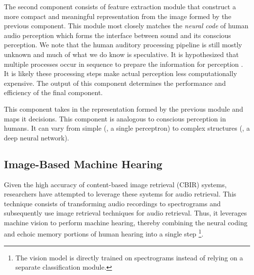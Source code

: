 The second component consists of feature extraction module that construct a more
compact and meaningful representation from the image formed by the previous
component.
This module most closely matches the \textit{neural code} of human audio
perception which forms the interface between sound and its conscious perception.
We note that the human auditory processing pipeline is still mostly unknown
and much of what we do know is speculative. 
It is hypothesized that multiple processes occur in
sequence to prepare the information for perception \cite{Eggermont2001}. 
It is likely these processing steps make actual perception less computationally
expensive. The output of this component determines the performance and
efficiency of the final component.

This component takes in the representation formed by the previous module 
and maps it decisions. This component is analogous to conscious perception in
humans. It can vary from simple (\eg, a single perceptron) to complex
structures (\eg, a deep neural network).

\subsection{Image-Based Machine Hearing}

Given the high accuracy of content-based image retrieval (CBIR) systems, 
researchers have attempted to leverage these systems for audio retrieval.
This technique consists of transforming audio recordings to spectrograms and
subsequently use image retrieval techniques for audio retrieval.
Thus, it leverages machine vision to perform machine hearing, thereby 
combining the neural coding and echoic memory portions of human hearing 
into a single step \footnote{The vision model is directly trained on
spectrograms instead of relying on a separate classification module.}.


